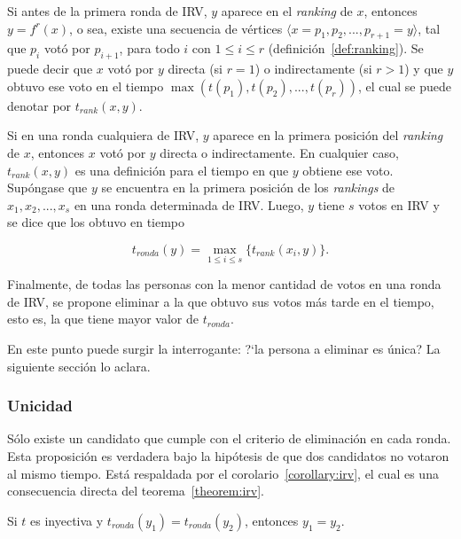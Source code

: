 Si antes de la primera ronda de IRV, $y$ aparece en el \textit{ranking} de $x$, entonces $y = f^r(x)$, o sea, existe una secuencia de v\'ertices $\langle x = p_1, p_2, ..., p_{r+1} = y \rangle$, tal que $p_i$ vot\'o por $p_{i+1}$, para todo $i$ con $1 \leq i \leq r$ (definici\'on~\ref{def:ranking}).  Se puede decir que $x$ vot\'o por $y$ directa (si $r=1$) o indirectamente (si $r>1$) y que $y$ obtuvo ese voto en el tiempo $\max (t(p_1), t(p_2), ..., t(p_r))$, el cual se puede denotar por $t_{rank}(x, y)$. 

Si en una ronda cualquiera de IRV, $y$ aparece en la primera posici\'on del \textit{ranking} de $x$, entonces $x$ vot\'o por $y$ directa o indirectamente. En cualquier caso, $t_{rank}(x, y)$ es una definici\'on para el tiempo en que $y$ obtiene ese voto. Sup\'ongase que $y$ se encuentra en la primera posici\'on de los \textit{rankings} de $x_1, x_2, ..., x_s$ en una ronda determinada de IRV. Luego, $y$ tiene $s$ votos en IRV y se dice que los obtuvo en tiempo 

\begin{equation}\label{eq:max-rank-time}
   t_{ronda}(y) = \underset{1 \leq i \leq s}{\max} \{ t_{rank}(x_i, y) \}. 
\end{equation}

Finalmente, de todas las personas con la menor cantidad de votos en una ronda de IRV, se propone eliminar a la que obtuvo sus votos m\'as tarde en el tiempo, esto es, la que tiene mayor valor  de $t_{ronda}$. 

En este punto puede surgir la interrogante: ?`la persona a eliminar es \'unica? La siguiente secci\'on lo aclara.

\subsubsection{Unicidad}
S\'olo existe un candidato que cumple con el criterio de eliminaci\'on en cada ronda. Esta proposici\'on es verdadera bajo la hip\'otesis de que dos candidatos no votaron al mismo tiempo. Est\'a respaldada por el corolario~\ref{corollary:irv}, el cual es una consecuencia directa del teorema~\ref{theorem:irv}.

\begin{theorem}\label{theorem:irv}
    Si $t$ es inyectiva y $t_{ronda}(y_1) = t_{ronda}(y_2)$, entonces $y_1 = y_2$.
\end{theorem}

